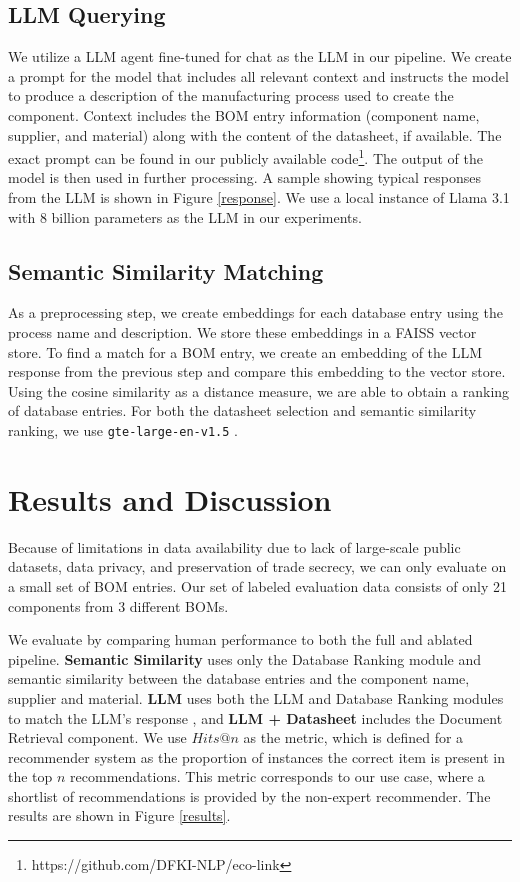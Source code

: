 \documentclass[11pt]{article}
\begin{document}
\subsection{LLM Querying}

We utilize a LLM agent fine-tuned for chat as the LLM in our pipeline. We create a prompt for the model that includes all relevant context and instructs the model to produce a description of the manufacturing process used to create the component. Context includes the BOM entry information (component name, supplier, and material) along with the content of the datasheet, if available. The exact prompt can be found in our publicly available code\footnote{https://github.com/DFKI-NLP/eco-link}. The output of the model is then used in further processing. A sample showing typical responses from the LLM is shown in Figure \ref{response}. We use a local instance of Llama 3.1 with 8 billion parameters \cite{dubey2024llama} as the LLM in our experiments.



\subsection{Semantic Similarity Matching}

As a preprocessing step, we create embeddings for each database entry using the process name and description. We store these embeddings in a FAISS \cite{douze2024faiss} vector store. To find a match for a BOM entry, we create an embedding of the LLM response from the previous step and compare this embedding to the vector store. Using the cosine similarity as a distance measure, we are able to obtain a ranking of database entries. For both the datasheet selection and semantic similarity ranking, we use \texttt{gte-large-en-v1.5} \cite{li2023towards}.


\section{Results and Discussion}




Because of limitations in data availability due to lack of large-scale public datasets, data privacy, and preservation of trade secrecy, we can only evaluate on a small set of BOM entries. Our set of labeled evaluation data consists of only 21 components from 3 different BOMs. 

We evaluate by comparing human performance to both the full and ablated pipeline. \textbf{Semantic Similarity} uses only the Database Ranking module and semantic similarity between the database entries and the component name, supplier and material. \textbf{LLM} uses both the LLM and Database Ranking modules to match the LLM's response , and \textbf{LLM + Datasheet} includes the Document Retrieval component. We use $Hits@n$ as the metric, which is defined for a recommender system as the proportion of instances the correct item is present in the top $n$ recommendations. This metric corresponds to our use case, where a shortlist of recommendations is provided by the non-expert recommender. The results are shown in Figure \ref{results}. 
\end{document}
